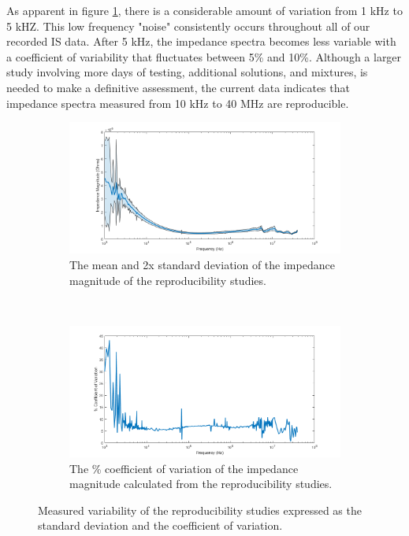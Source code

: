 \par As apparent in figure \ref{fig:IS_data_variation}, there is a considerable amount of variation from 1 kHz to 5 kHZ. This low frequency "noise" consistently occurs throughout all of our recorded IS data. After 5 kHz, the impedance spectra becomes less variable with a coefficient of variability that fluctuates between 5\% and 10\%. Although a larger study involving more days of testing, additional solutions, and mixtures, is needed to make a definitive assessment, the current data indicates that impedance spectra measured from 10 kHz to 40 MHz are reproducible.


\begin{figure}[h]
    \centering
    \begin{subfigure}[b]{\textwidth}
        \centering
        \includegraphics[width=\textwidth]{images/reproducibility_mean_std.png}
        \caption{The mean and 2x standard deviation of the impedance magnitude of the reproducibility studies.}
    \end{subfigure}
    \\
    \vspace{0.1 in}
    \begin{subfigure}[b]{\textwidth}
        \centering
        \includegraphics[width=\textwidth]{images/reproducibility_CV.png}
        \caption{The \% coefficient of variation of the impedance magnitude calculated from the reproducibility studies.}
    \end{subfigure}
    \caption{Measured variability of the reproducibility studies expressed as the standard deviation and the coefficient of variation.}
    \label{fig:IS_data_variation}
\end{figure}


